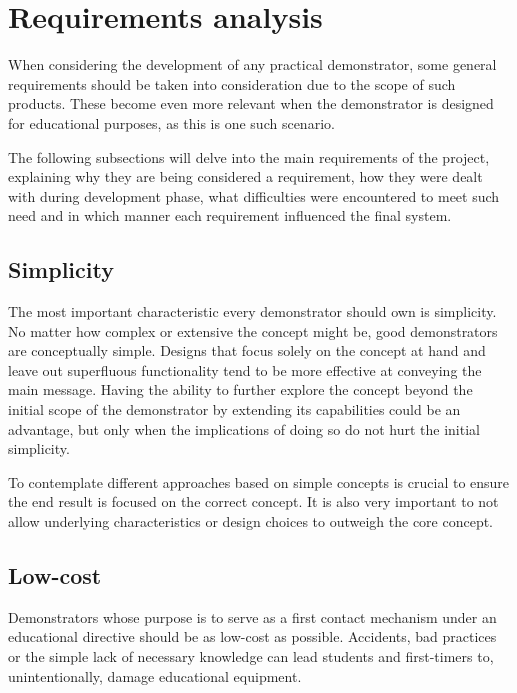\section{Requirements analysis} \label{sec:requirements}


When considering the development of any practical demonstrator, some general requirements should be taken into consideration due to the scope of such products.
These become even more relevant when the demonstrator is designed for educational purposes, as this is one such scenario.

The following subsections will delve into the main requirements of the project, explaining why they are being considered a requirement, how they were dealt with during development phase, what difficulties were encountered to meet such need and in which manner each requirement influenced the final system.

\subsection{Simplicity}

The most important characteristic every demonstrator should own is simplicity.
No matter how complex or extensive the concept might be, good demonstrators are conceptually simple.
Designs that focus solely on the concept at hand and leave out superfluous functionality tend to be more effective at conveying the main message.
Having the ability to further explore the concept beyond the initial scope of the demonstrator by extending its capabilities could be an advantage, but only when the implications of doing so do not hurt the initial simplicity.

To contemplate different approaches based on simple concepts is crucial to ensure the end result is focused on the correct concept.
It is also very important to not allow underlying characteristics or design choices to outweigh the core concept.

\subsection{Low-cost} \label{sec:low-cost}

Demonstrators whose purpose is to serve as a first contact mechanism under an educational directive should be as low-cost as possible.
Accidents, bad practices or the simple lack of necessary knowledge can lead students and first-timers to, unintentionally, damage educational equipment.

